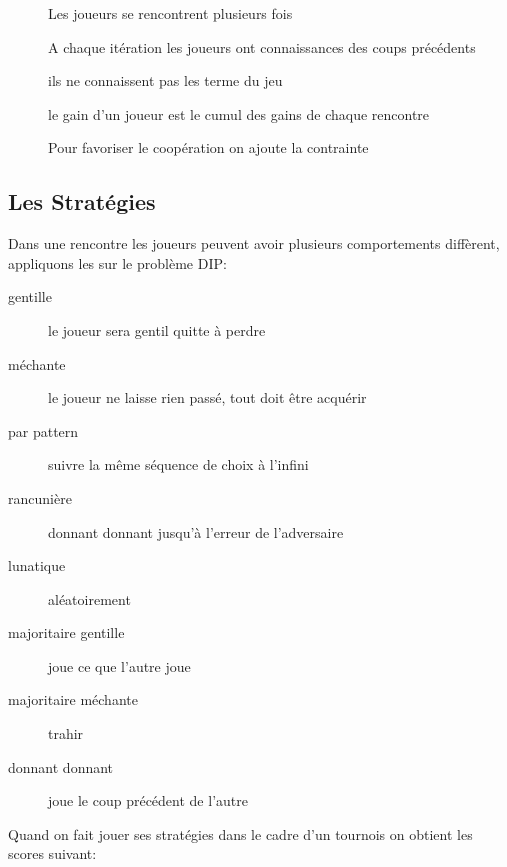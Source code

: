 \begin{description}
\item[] Les joueurs se rencontrent plusieurs fois
\item[] A chaque itération les joueurs ont connaissances des coups précédents 
\item[] ils ne connaissent pas les terme du jeu
\item[] le gain d'un joueur est le cumul des gains de chaque rencontre
\item[] Pour favoriser le coopération on ajoute la contrainte 
\end{description}

\subsection{Les Stratégies}

Dans une rencontre les joueurs peuvent avoir plusieurs comportements diffèrent, appliquons les sur le problème DIP:
\begin{description}
\item[gentille] le joueur sera gentil quitte à perdre
\item[méchante] le joueur ne laisse rien passé, tout doit être acquérir 
\item[par pattern] suivre la même séquence de choix à l'infini
\item[rancunière] donnant donnant jusqu'à l'erreur de l'adversaire
\item[lunatique] aléatoirement
\item[majoritaire gentille] joue ce que l'autre joue
\item[majoritaire méchante] trahir
\item[donnant donnant] joue le coup précédent de l'autre
\end{description}

Quand on fait jouer ses stratégies dans le cadre d'un tournois on obtient les scores suivant:

